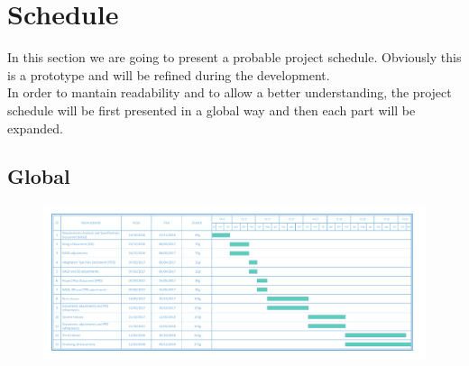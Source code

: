 \documentclass[english]{article}
\begin{document}
\section{Schedule}
	In this section we are going to present a probable project schedule. Obviously this is a prototype and will be refined during the development. \\
	In order to mantain readability and to allow a better understanding, the project schedule will be first presented in a global way and then each part will be expanded.
		\begin{landscape}
	\subsection{Global}
		\begin{figure}[H]
			\centering
			\includegraphics[scale=0.675]{Images/0-Global18.pdf} 
		\end{figure}
		\end{landscape}
\end{document}
